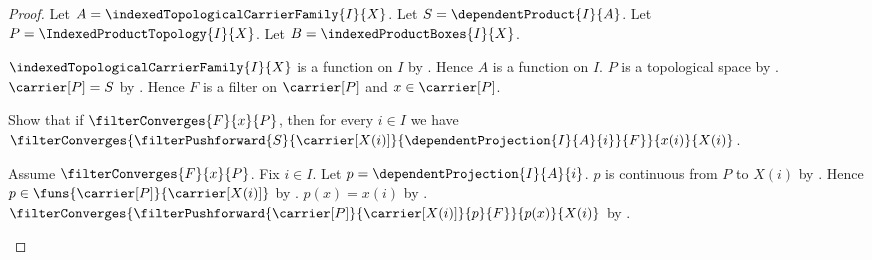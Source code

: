 \begin{proof}
    Let $A=\indexedTopologicalCarrierFamily{I}{X}$.
    Let $S=\dependentProduct{I}{A}$.
    Let $P=\IndexedProductTopology{I}{X}$.
    Let $B=\indexedProductBoxes{I}{X}$.

    $\indexedTopologicalCarrierFamily{I}{X}$ is a function on $I$ by
        .
    Hence $A$ is a function on $I$.
    $P$ is a topological space by
        .
    $\carrier[P]=S$ by
        .
    Hence $F$ is a filter on $\carrier[P]$ and
        $x\in\carrier[P]$.

    Show that if $\filterConverges{F}{x}{P}$, then for every $i\in I$
        we have
        $\filterConverges{
            \filterPushforward{S}{\carrier[X(i)]}{
                \dependentProjection{I}{A}{i}}{F}
        }{x(i)}{X(i)}$.
    \begin{subproof}
        Assume $\filterConverges{F}{x}{P}$.
        Fix $i\in I$.
        Let $p=\dependentProjection{I}{A}{i}$.
        $p$ is continuous from $P$ to $X(i)$ by
            .
        Hence $p\in\funs{\carrier[P]}{\carrier[X(i)]}$ by
            .
        $p(x)=x(i)$ by
            .
        $\filterConverges{
            \filterPushforward{\carrier[P]}{\carrier[X(i)]}{p}{F}
        }{p(x)}{X(i)}$ by
            .
    \end{subproof}


\end{proof}
